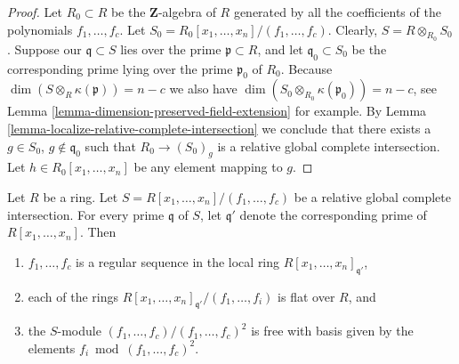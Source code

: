 \begin{proof}
Let $R_0 \subset R$ be the $\mathbf{Z}$-algebra of $R$
generated by all the coefficients of the polynomials
$f_1, \ldots, f_c$. Let $S_0 = R_0[x_1, \ldots, x_n]/(f_1, \ldots, f_c)$.
Clearly, $S = R \otimes_{R_0} S_0$.
Suppose our $\mathfrak q \subset S$ lies over
the prime  $\mathfrak p \subset R$, and
let $\mathfrak q_0 \subset S_0$ be the corresponding prime
lying over the prime $\mathfrak p_0$ of $R_0$.
Because $\dim (S \otimes_R \kappa(\mathfrak p) ) = n - c$
we also have $\dim (S_0 \otimes_{R_0} \kappa(\mathfrak p_0)) = n - c$,
see Lemma \ref{lemma-dimension-preserved-field-extension} for example.
By Lemma \ref{lemma-localize-relative-complete-intersection} we
conclude that there exists a $g \in S_0$, $g \not \in \mathfrak q_0$
such that $R_0 \to (S_0)_g$ is a relative global complete
intersection. Let $h \in R_0[x_1, \ldots, x_n]$ be any element
mapping to $g$.
\end{proof}

\begin{lemma}
\label{lemma-relative-global-complete-intersection-conormal}
Let $R$ be a ring. Let $S = R[x_1, \ldots, x_n]/(f_1, \ldots, f_c)$
be a relative global complete intersection. For every prime
$\mathfrak q$ of $S$, let $\mathfrak q'$ denote the corresponding
prime of $R[x_1, \ldots, x_n]$. Then
\begin{enumerate}
\item $f_1, \ldots, f_c$ is a regular sequence in the local ring
$R[x_1, \ldots, x_n]_{\mathfrak q'}$,
\item each of the rings
$R[x_1, \ldots, x_n]_{\mathfrak q'}/(f_1, \ldots, f_i)$ is flat over $R$, and
\item the $S$-module $(f_1, \ldots, f_c)/(f_1, \ldots, f_c)^2$
is free with basis given by the elements $f_i \bmod (f_1, \ldots, f_c)^2$.
\end{enumerate}
\end{lemma}

